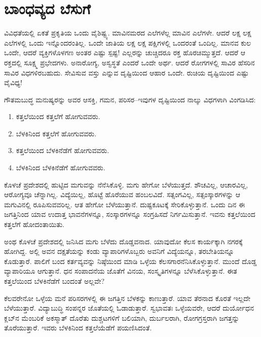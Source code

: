 \section*{ಬಾಂಧವ್ಯದ ಬೆಸುಗೆ}


ವಿವಿಧತೆಯಲ್ಲಿ ಏಕತೆ ಪ್ರಕೃತಿಯ ಒಂದು ವೈಶಿಷ್ಟ್ಯ. ಮಾವಿನಮರದ ಎಲೆಗಳೆಲ್ಲ ಮಾವಿನ ಎಲೆಗಳೇ. ಆದರೆ ಲಕ್ಷ ಲಕ್ಷ ಎಲೆಗಳಲ್ಲಿ ಒಂದು ಇನ್ನೊಂದರಂತಿಲ್ಲ. ಒಂದೇ ಜಾತಿಯ ಲಕ್ಷ ಲಕ್ಷ ಪಕ್ಷಿಗಳಲ್ಲಿ ಒಂದರಂತೆ ಒಂದಿಲ್ಲ. ಮಾನವ ಕುಲ ಒಂದೇ, ಆದರೆ ವ್ಯಕ್ತಿಗಳೊಳಗಣ ಅಂತರ ಎಷ್ಟು ಸ್ಪಷ್ಟ! ಎಲ್ಲರನ್ನು ಚುಚ್ಚಿದರೂ ರಕ್ತ ಹೊರಚಿಮ್ಮುತ್ತದೆ. ಆದರೆ ಆ ರಕ್ತದಲ್ಲಿ ಸೂಕ್ಷ್ಮ ಪ್ರಭೇದಗಳು. ಅನಾರೋಗ್ಯ, ಅಸ್ವಸ್ಥತೆ ಎಂದರೆ ಒಂದೇ ಅರ್ಥ. ಆದರೆ ರೋಗಗಳಲ್ಲಿ ಸಾವಿರ ಹೆಸರಿನ ಸಾವಿರ ವಿಧಗಳಿರಬಹುದು. ಸೇವಿಸುವ ವಸ್ತು ಎನ್ನುವ ದೃಷ್ಟಿಯಿಂದ ಆಹಾರ ಒಂದೇ. ರುಚಿಯ ದೃಷ್ಟಿಯಿಂದ ಎಷ್ಟು ವೈವಿಧ್ಯ!

ಗೌತಮಬುದ್ಧ ಮನುಷ್ಯರನ್ನು ಅವರ ಆಸಕ್ತಿ, ಗಮನ, ಪರಿಸರ–ಇವುಗಳ ದೃಷ್ಟಿಯಿಂದ ನಾಲ್ಕು ವಿಧಗಳಾಗಿ ವಿಂಗಡಿಸಿದ:

\begin{enumerate}
\item ಕತ್ತಲೆಯಿಂದ ಕತ್ತಲೆಗೆ ಹೋಗುವವರು.

 \item ಬೆಳಕಿನಿಂದ ಕತ್ತಲೆಗೆ ಹೋಗುವವರು.

 \item ಕತ್ತಲೆಯಿಂದ ಬೆಳಕಿನೆಡೆಗೆ ಹೋಗುವವರು.

 \item ಬೆಳಕಿನಿಂದ ಬೆಳಕಿನೆಡೆಗೆ ಹೋಗುವವರು.

\end{enumerate}

\egroup

ಕೊಳಚೆ ಪ್ರದೇಶದಲ್ಲಿ ಹುಟ್ಟಿದ ಮಗುವನ್ನು ನೆನೆಸಿಕೊಳ್ಳಿ. ಮಗು ಹೇಗೋ ಬೆಳೆಯುತ್ತದೆ. ಶೌಚವಿಲ್ಲ, ಆಚಾರವಿಲ್ಲ, ಆರೋಗ್ಯವೂ ಚೆನ್ನಾಗಿಲ್ಲ. ವಿದ್ಯೆಯಿಲ್ಲ, ಹೊಟ್ಟೆ ಹೊರೆಯುವ ಹಂಬಲವಿದೆ. ಸತ್ಸಂಗವಿಲ್ಲ, ಸತ್ಸಂಸ್ಕಾರಗಳನ್ನು ಆ ಮಗುವಿನಲ್ಲಿ ರೂಪಿಸುವವರಿಲ್ಲ. ಆತ ಹೇಗೋ ಬೆಳೆಯುತ್ತಾನೆ. ದುಷ್ಟಕೂಟಕ್ಕೆ ಸೇರಿಕೊಳ್ಳುತ್ತಾನೆ. ಒಂದು ದಿನ ಈ ಜಗತ್ತಿನಿಂದ ಯಾವ ಉದಾತ್ತ ಭಾವನೆಗಳನ್ನೂ, ಸಂಸ್ಕಾರಗಳನ್ನೂ ಸಂಗ್ರಹಿಸದೆ ನಿರ್ಗಮಿಸುತ್ತಾನೆ. ಇವನು ಕತ್ತಲೆಯಿಂದ ಕತ್ತಲೆಗೆ ಹೋದಂತಾಯಿತು.

ಅಂಥ ಕೊಳಚೆ ಪ್ರದೇಶದಲ್ಲಿ ಜನಿಸಿದ ಮಗು ಬೆಳೆದು ದೊಡ್ಡವನಾದ. ಯಾವುದೋ ಕೆಲಸ ಕಾರ್ಯಕ್ಕಾಗಿ ನಗರಕ್ಕೆ ಹೋಗಿದ್ದ. ಅಲ್ಲಿ ಅವನ ದಕ್ಷತೆಯನ್ನು ಕಂಡು ವ್ಯಾಪಾರಿಗಳೊಬ್ಬರು ಅವನಿಗೆ ವಿದ್ಯೆಯನ್ನೂ, ತರಬೇತಿಯನ್ನೂ ಕೊಡುತ್ತಾರೆ. ಪಾಲಿಗೆ ಬಂದ ಕರ್ತವ್ಯವನ್ನು ನಿಷ್ಠೆಯಿಂದ ಮಾಡಿ ಒಳ್ಳೆಯ ಕೆಲಸಗಾರನೆನಿಸಿಕೊಳ್ಳುತ್ತಾನೆ. ಮುಂದೆ ದೊಡ್ಡ ವ್ಯಾಪಾರಿಯೂ ಆಗುತ್ತಾನೆ. ಧನ ಸಂಪಾದನೆಯ ಜೊತೆಗೆ ವಿನಯ, ಸಂಸ್ಕೃತಿಗಳನ್ನೂ ಬೆಳೆಸಿಕೊಳ್ಳುತ್ತಾನೆ. ಈತ ಕತ್ತಲೆಯಿಂದ ಬೆಳಕಿನೆಡೆಗೆ ಬಂದಂತೆ ಅಲ್ಲವೇ?

ಕೆಲವರೇನೋ ಒಳ್ಳೆಯ ಮನೆ ಪರಿಸರಗಳಲ್ಲಿ ಈ ಜಗತ್ತಿನ ಬೆಳಕನ್ನು ಕಾಣುತ್ತಾರೆ. ಯಾವ ತೆರನಾದ ಕೊರತೆ ಇಲ್ಲದೇ ಬೆಳೆಯುತ್ತಾರೆ. ವಿದ್ಯಾಬುದ್ಧಿ ಸಂಪನ್ನರ ಜೊತೆಯಲ್ಲಿ ಓಡಾಡುತ್ತಾರೆ. ಸ್ವಭಾವತಃ ಒಳ್ಳೆಯವರೇ, ಆದರೆ ದುರ್ಯೋಧನ ಕ್ಲಬ್​ನ ಮೆಂಬರಿಕೆ ಅಕಸ್ಮಾತ್ ದೊರೆತು ದುಶ್ಚಟಗಳಿಗೆ ಬಲಿಯಾಗಿ, ದುರ್ಬಲರಾಗಿ, ರೋಗಗ್ರಸ್ತರಾಗಿ ಜಗತ್ತನ್ನು ತೊರೆಯುತ್ತಾರೆ. ಇವರು ಬೆಳಕಿನಿಂದ ಕತ್ತಲೆಯೆಡೆಗೆ ಪಯಣಿಸಿದಂತೆ.

